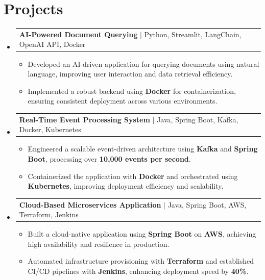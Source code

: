 \documentclass[letterpaper,11pt]{article}
\makeatletter
\newcommand{\resumeItem}[1]{
  \item\footnotesize{
    {#1 \vspace{-2pt}}
  }
}
\newcommand{\resumeProjectHeading}[2]{
    \item
    \begin{tabular*}{1.001\textwidth}{l@{\extracolsep{\fill}}r}
      \small#1 & \textbf{\small #2}\\
    \end{tabular*}\vspace{-7pt}
}
\newcommand{\resumeSubHeadingListStart}{\begin{itemize}[leftmargin=0pt, label={}]}
\newcommand{\resumeSubHeadingListEnd}{\end{itemize}}
\newcommand{\resumeItemListStart}{\begin{itemize}[leftmargin=*]}
\newcommand{\resumeItemListEnd}{\end{itemize}\vspace{-5pt}}
\makeatother
\begin{document}
\section{Projects}
    \vspace{-5pt}
    \resumeSubHeadingListStart

      \resumeProjectHeading
          {\textbf{AI-Powered Document Querying} $|$ Python, Streamlit, LangChain, OpenAI API, Docker}{ }
        \resumeItemListStart
            \resumeItem{Developed an AI-driven application for querying documents using natural language, improving user interaction and data retrieval efficiency.}
            \resumeItem{Implemented a robust backend using \textbf{Docker} for containerization, ensuring consistent deployment across various environments.}
        \resumeItemListEnd
        \vspace{-12pt}

      \resumeProjectHeading
          {\textbf{Real-Time Event Processing System} $|$ Java, Spring Boot, Kafka, Docker, Kubernetes}{ }
        \resumeItemListStart
            \resumeItem{Engineered a scalable event-driven architecture using \textbf{Kafka} and \textbf{Spring Boot}, processing over \textbf{10,000 events per second}.}
            \resumeItem{Containerized the application with \textbf{Docker} and orchestrated using \textbf{Kubernetes}, improving deployment efficiency and scalability.}
        \resumeItemListEnd
        \vspace{-12pt}

      \resumeProjectHeading
          {\textbf{Cloud-Based Microservices Application} $|$ Java, Spring Boot, AWS, Terraform, Jenkins}{ }
        \resumeItemListStart
            \resumeItem{Built a cloud-native application using \textbf{Spring Boot} on \textbf{AWS}, achieving high availability and resilience in production.}
            \resumeItem{Automated infrastructure provisioning with \textbf{Terraform} and established CI/CD pipelines with \textbf{Jenkins}, enhancing deployment speed by \textbf{40\%}.}
        \resumeItemListEnd

    \resumeSubHeadingListEnd
\end{document}
